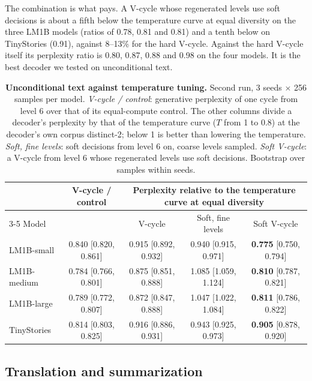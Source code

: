 \documentclass[11pt]{article}
\begin{document}
The combination is what pays. A V-cycle whose regenerated levels use soft decisions is about a fifth below the
temperature curve at equal diversity on the three LM1B models (ratios of 0.78, 0.81 and 0.81) and a tenth below on
TinyStories (0.91), against 8--13\% for the hard V-cycle.
Against the hard V-cycle itself its perplexity ratio is 0.80, 0.87, 0.88 and 0.98 on the four models. It is the best
decoder we tested on unconditional text.

\begin{table}[t]
\centering
\small
\renewcommand{\arraystretch}{1.12}
\begin{tabular*}{\linewidth}{@{\extracolsep{\fill}}lcccc@{}}
\toprule
 & V-cycle / control & \multicolumn{3}{c}{Perplexity relative to the temperature curve at equal diversity} \\
\cmidrule(l){3-5}
Model & & V-cycle & Soft, fine levels & Soft V-cycle \\
\midrule
LM1B-small & 0.840 [0.820, 0.861] & 0.915 [0.892, 0.932] & 0.940 [0.915, 0.971] & \textbf{0.775} [0.750, 0.794] \\
LM1B-medium & 0.784 [0.766, 0.801] & 0.875 [0.851, 0.888] & 1.085 [1.059, 1.124] & \textbf{0.810} [0.787, 0.821] \\
LM1B-large & 0.789 [0.772, 0.807] & 0.872 [0.847, 0.888] & 1.047 [1.022, 1.084] & \textbf{0.811} [0.786, 0.822] \\
TinyStories & 0.814 [0.803, 0.825] & 0.916 [0.886, 0.931] & 0.943 [0.925, 0.973] & \textbf{0.905} [0.878, 0.920] \\
\bottomrule
\end{tabular*}
\caption{\textbf{Unconditional text against temperature tuning.} Second run, 3 seeds $\times$ 256 samples per model.
\emph{V-cycle / control}: generative perplexity of one cycle from level 6 over that of its equal-compute control. The
other columns divide a decoder's perplexity by that of the temperature curve ($T$ from 1 to 0.8) at the decoder's own
corpus distinct-2; below 1 is better than lowering the temperature. \emph{Soft, fine levels}: soft decisions from
level 6 on, coarse levels sampled. \emph{Soft V-cycle}: a V-cycle from level 6 whose regenerated levels use soft
decisions. Bootstrap over samples within seeds.}
\label{tab:frontier}
\end{table}

\subsection{Translation and summarization}
\end{document}
